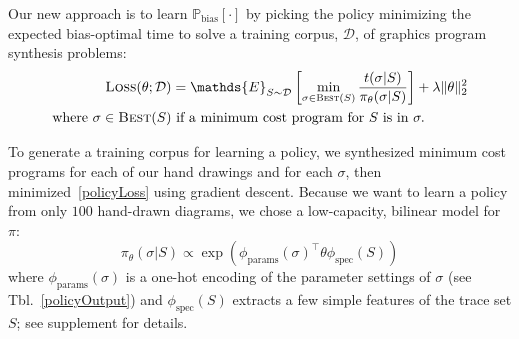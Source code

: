 \documentclass{article}
\newcommand{\expect}{\mathds{E}} %
\newcommand{\probability}{\mathds{P}} %
\theoremstyle{definition}
\begin{document}
Our new approach is to learn $\probability_{\text{bias}}[\cdot ]$
by picking the policy minimizing the
expected bias-optimal time to solve a training corpus, $\mathcal{D}$, of graphics program synthesis problems:
\begin{align}
\textsc{Loss}(\theta ; \mathcal{D})& =  \expect_{S\sim\mathcal{D}}\left[ \min_{\sigma\in \text{\textsc{Best}}(S)}\frac{t(\sigma | S)}{\pi_\theta (\sigma | S)}\right] + \lambda \Vert\theta\Vert_2^2\label{policyLoss}\\
\text{where }  \sigma \in\text{\textsc{Best}}(S) &\text{ if  a minimum cost program for }S \text{ is in }\sigma .\nonumber %
\end{align}

To generate a training corpus for learning a policy,
we synthesized minimum cost programs for each of our hand drawings
and for each $\sigma $,
then minimized~\ref{policyLoss} using gradient descent. %
Because we want to learn a policy from only $100$ hand-drawn diagrams,
we chose a  low-capacity, bilinear model for $\pi$:
\begin{equation}
  \pi_{\theta}(\sigma |S)\propto \exp \left( \phi_{\text{params}}(\sigma )^\top\theta \phi_{\text{spec}}(S)\right)
\end{equation}
where $\phi_{\text{params}}(\sigma  )$ is a one-hot encoding of
the parameter settings of $\sigma $ (see Tbl.~\ref{policyOutput})
and $\phi_{\text{spec}}(S)$ extracts a few simple features of the trace set $S$;
see supplement for details.
\end{document}
